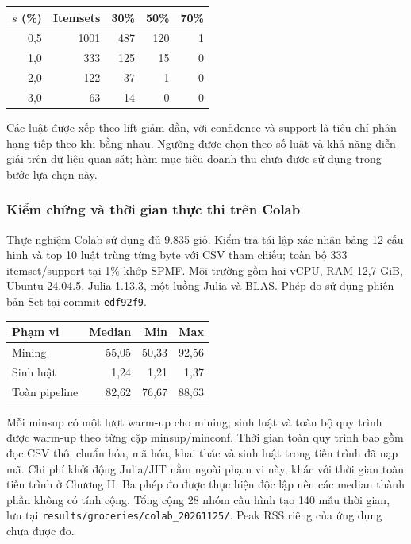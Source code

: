 \begin{reporttable}
\caption{Số itemsets và số luật theo minsup, minconf. Ba cột cuối là số luật tại từng minconf.}\label{tab:params}
\centering\footnotesize
\begin{tabular}{rrrrr}\toprule
$s$ (\%) & Itemsets & 30\% & 50\% & 70\% \\\midrule
0,5 & 1001 & 487 & 120 & 1 \\
1,0 & 333 & 125 & 15 & 0 \\
2,0 & 122 & 37 & 1 & 0 \\
3,0 & 63 & 14 & 0 & 0 \\
\bottomrule\end{tabular}
\end{reporttable}

Các luật được xếp theo lift giảm dần, với confidence và support là tiêu
chí phân hạng tiếp theo khi bằng nhau. Ngưỡng được chọn theo số luật và
khả năng diễn giải trên dữ liệu quan sát; hàm mục tiêu doanh thu chưa
được sử dụng trong bước lựa chọn này.

\subsubsection{Kiểm chứng và thời gian thực thi trên Colab}
Thực nghiệm Colab sử dụng đủ 9.835 giỏ. Kiểm tra tái lập xác nhận bảng
12 cấu hình và top 10 luật trùng từng byte với CSV tham chiếu; toàn bộ
333 itemset/support tại 1\% khớp SPMF. Môi trường gồm hai vCPU,
RAM 12,7 GiB, Ubuntu 24.04.5, Julia 1.13.3, một luồng Julia và BLAS.
Phép đo sử dụng phiên bản Set tại commit \texttt{edf92f9}.

\begin{reporttable}
\caption{Groceries trên Colab tại minsup 1\%, minconf 50\%; năm lượt sau warm-up, đơn vị ms.}
\label{tab:groceries-timing}
\centering\footnotesize
\begin{tabular}{lrrr}\toprule
Phạm vi & Median & Min & Max\\\midrule
Mining & 55,05 & 50,33 & 92,56\\
Sinh luật & 1,24 & 1,21 & 1,37\\
Toàn pipeline & 82,62 & 76,67 & 88,63\\\bottomrule
\end{tabular}
\end{reporttable}

Mỗi minsup có một lượt warm-up cho mining; sinh luật và toàn bộ quy
trình được warm-up theo từng cặp minsup/minconf. Thời gian toàn quy
trình bao gồm đọc CSV thô, chuẩn hóa, mã hóa, khai thác và sinh luật
trong tiến trình đã nạp mã. Chi phí khởi động Julia/JIT nằm ngoài phạm
vi này, khác với thời gian toàn tiến trình ở Chương II. Ba phép đo được
thực hiện độc lập nên các median thành phần không có tính cộng. Tổng
cộng 28 nhóm cấu hình tạo 140 mẫu thời gian, lưu tại
\texttt{results/groceries/colab\_20261125/}. Peak RSS riêng của ứng
dụng chưa được đo.

